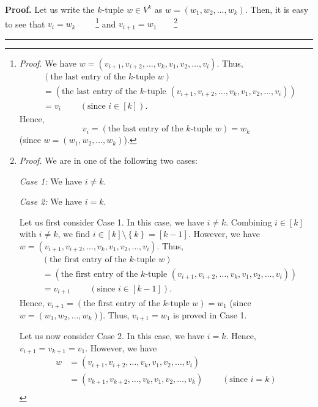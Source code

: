 \documentclass[numbers=enddot,12pt,final,onecolumn,notitlepage]{scrartcl}%
\numberwithin{exer}{section}
\theoremstyle{definition}
\newenvironment{proof}[1][Proof]{\noindent\textbf{#1.} }{\ \rule{0.5em}{0.5em}}
\newenvironment{verlong}{}{}
\begin{document}
\begin{verlong}
\begin{proof}
Let us write the $k$-tuple $w\in V^{k}$ as $w=\left(  w_{1},w_{2},\ldots
,w_{k}\right)  $. Then, it is easy to see that $v_{i}=w_{k}$%
\ \ \ \ \footnote{\textit{Proof.} We have $w=\left(  v_{i+1},v_{i+2}%
,\ldots,v_{k},v_{1},v_{2},\ldots,v_{i}\right)  $. Thus,
\begin{align*}
&  \left(  \text{the last entry of the }k\text{-tuple }w\right) \\
&  =\left(  \text{the last entry of the }k\text{-tuple }\left(  v_{i+1}%
,v_{i+2},\ldots,v_{k},v_{1},v_{2},\ldots,v_{i}\right)  \right) \\
&  =v_{i}\ \ \ \ \ \ \ \ \ \ \left(  \text{since }i\in\left[  k\right]
\right)  .
\end{align*}
Hence,%
\[
v_{i}=\left(  \text{the last entry of the }k\text{-tuple }w\right)  =w_{k}%
\]
(since $w=\left(  w_{1},w_{2},\ldots,w_{k}\right)  $).} and $v_{i+1}=w_{1}%
$\ \ \ \ \footnote{\textit{Proof.} We are in one of the following two cases:
\par
\textit{Case 1:} We have $i\neq k$.
\par
\textit{Case 2:} We have $i=k$.
\par
Let us first consider Case 1. In this case, we have $i\neq k$. Combining
$i\in\left[  k\right]  $ with $i\neq k$, we find $i\in\left[  k\right]
\setminus\left\{  k\right\}  =\left[  k-1\right]  $. However, we have
$w=\left(  v_{i+1},v_{i+2},\ldots,v_{k},v_{1},v_{2},\ldots,v_{i}\right)  $.
Thus,
\begin{align*}
&  \left(  \text{the first entry of the }k\text{-tuple }w\right) \\
&  =\left(  \text{the first entry of the }k\text{-tuple }\left(
v_{i+1},v_{i+2},\ldots,v_{k},v_{1},v_{2},\ldots,v_{i}\right)  \right) \\
&  =v_{i+1}\ \ \ \ \ \ \ \ \ \ \left(  \text{since }i\in\left[  k-1\right]
\right)  .
\end{align*}
Hence, $v_{i+1}=\left(  \text{the first entry of the }k\text{-tuple }w\right)
=w_{1}$ (since $w=\left(  w_{1},w_{2},\ldots,w_{k}\right)  $). Thus,
$v_{i+1}=w_{1}$ is proved in Case 1.
\par
Let us now consider Case 2. In this case, we have $i=k$. Hence, $v_{i+1}%
=v_{k+1}=v_{1}$. However, we have
\begin{align*}
w  &  =\left(  v_{i+1},v_{i+2},\ldots,v_{k},v_{1},v_{2},\ldots,v_{i}\right) \\
&  =\left(  v_{k+1},v_{k+2},\ldots,v_{k},v_{1},v_{2},\ldots,v_{k}\right)
\ \ \ \ \ \ \ \ \ \ \left(  \text{since }i=k\right) \\

\end{align*}}
\end{proof}
\end{verlong}
\end{document}
